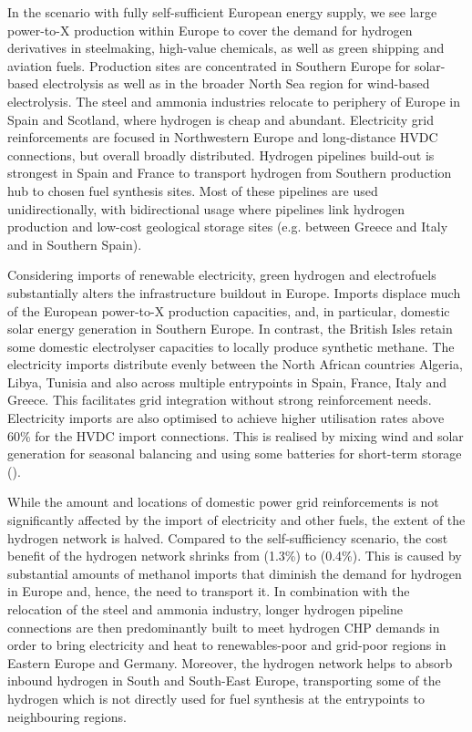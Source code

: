 In the scenario with fully self-sufficient European energy supply, we see large
\mbox{power-to-X} production within Europe to cover the demand for hydrogen
derivatives in steelmaking, high-value chemicals, as well as green shipping and
aviation fuels. Production sites are concentrated in Southern Europe for
solar-based electrolysis as well as in the broader North Sea region for
wind-based electrolysis. The steel and ammonia industries relocate to periphery
of Europe in Spain and Scotland, where hydrogen is cheap and abundant.
Electricity grid reinforcements are focused in Northwestern Europe and
long-distance HVDC connections, but overall broadly distributed. Hydrogen
pipelines build-out is strongest in Spain and France to transport hydrogen from
Southern production hub to chosen fuel synthesis sites.
Most of these pipelines are used unidirectionally, with bidirectional usage
where pipelines link hydrogen production and low-cost geological storage sites
(e.g. between Greece and Italy and in Southern Spain).


Considering imports of renewable electricity, green hydrogen and electrofuels
substantially alters the infrastructure buildout in Europe. Imports displace
much of the European power-to-X production capacities, and, in particular,
domestic solar energy generation in Southern Europe. In contrast, the British
Isles retain some domestic electrolyser capacities to locally produce synthetic
methane. The electricity imports distribute evenly between the North African
countries Algeria, Libya, Tunisia and also across multiple entrypoints in Spain,
France, Italy and Greece. This facilitates grid integration without strong
reinforcement needs. Electricity imports are also optimised to achieve higher
utilisation rates above 60\% for the HVDC import connections. This is realised
by mixing wind and solar generation for seasonal balancing and using some
batteries for short-term storage ().

While the amount and locations of domestic power grid reinforcements is not
significantly affected by the import of electricity and other fuels, the extent
of the hydrogen network is halved. Compared to the self-sufficiency scenario,
the cost benefit of the hydrogen network shrinks from  (1.3\%) to
 (0.4\%). This is caused by substantial amounts of methanol imports
that diminish the demand for hydrogen in Europe and, hence, the need to
transport it. In combination with the relocation of the steel and ammonia
industry, longer hydrogen pipeline connections are then predominantly built to
meet hydrogen CHP demands in order to bring electricity and heat to
renewables-poor and grid-poor regions in Eastern Europe and Germany. Moreover,
the hydrogen network helps to absorb inbound hydrogen in South and South-East
Europe, transporting some of the hydrogen which is not directly used for fuel
synthesis at the entrypoints to neighbouring regions. 

